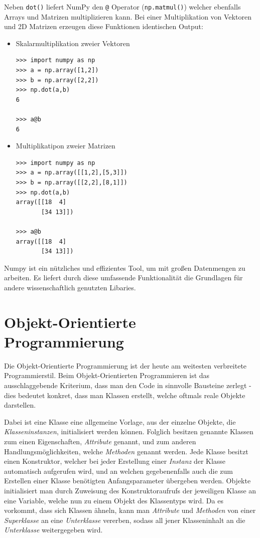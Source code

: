 \documentclass[]{dsadokumentation}
\begin{document}
Neben \verb|dot()| liefert NumPy den \verb|@| Operator (\verb|np.matmul()|) welcher ebenfalls Arrays und Matrizen multiplizieren kann.
Bei einer Multiplikation von Vektoren und 2D Matrizen erzeugen diese Funktionen identischen Output:

\begin{itemize}
  \item Skalarmultiplikation zweier Vektoren
        \begin{verbatim}
>>> import numpy as np
>>> a = np.array([1,2])
>>> b = np.array([2,2])
>>> np.dot(a,b)
6

>>> a@b
6
\end{verbatim}

  \item Multiplikatipon zweier Matrizen
        \begin{verbatim}
>>> import numpy as np
>>> a = np.array([[1,2],[5,3]])
>>> b = np.array([[2,2],[8,1]])
>>> np.dot(a,b)
array([[18  4]
       [34 13]])

>>> a@b
array([[18  4]
       [34 13]])
\end{verbatim}
\end{itemize}

Numpy ist ein nützliches und effizientes Tool, um mit großen Datenmengen zu arbeiten. Es liefert durch diese umfassende Funktionalität die Grundlagen für andere wissenschaftlich genutzten Libaries.

\section{Objekt-Orientierte Programmierung}
Die Objekt-Orientierte Programmierung ist der heute am weitesten verbreitete Programmierstil. Beim Objekt-Orientierten Programmieren ist das ausschlaggebende Kriterium, dass man den Code in sinnvolle Bausteine zerlegt - dies bedeutet konkret, dass man Klassen erstellt, welche oftmals reale Objekte darstellen.

Dabei ist eine Klasse eine allgemeine Vorlage, aus der einzelne Objekte, die \emph{Klasseninstanzen}, initialisiert werden können. Folglich besitzen genannte Klassen zum einen Eigenschaften, \emph{Attribute} genannt, und zum anderen Handlungsmöglichkeiten, welche \emph{Methoden} genannt werden. Jede Klasse besitzt einen Konstruktor, welcher bei jeder Erstellung einer \emph{Instanz} der Klasse automatisch aufgerufen wird, und an welchen gegebenenfalls auch die zum Erstellen einer Klasse benötigten Anfangsparameter übergeben werden. Objekte initialisiert man durch Zuweisung des Konstruktoraufrufs der jeweiligen Klasse an eine Variable, welche nun zu einem Objekt des Klassentyps wird. Da es vorkommt, dass sich Klassen ähneln, kann man \emph{Attribute} und \emph{Methoden} von einer \emph{Superklasse} an eine \emph{Unterklasse} vererben, sodass all jener Klasseninhalt an die \emph{Unterklasse} weitergegeben wird.
\end{document}
